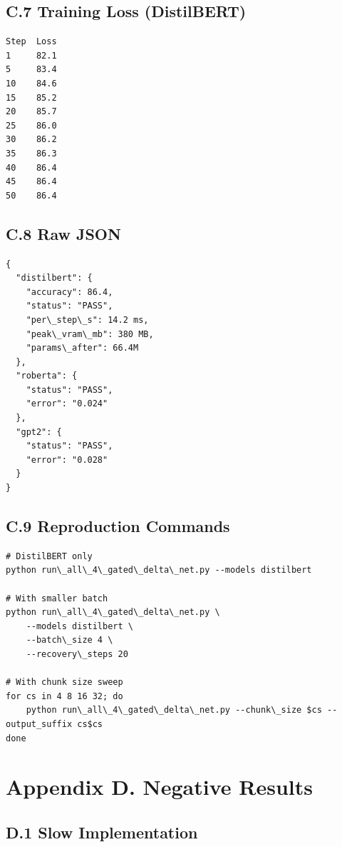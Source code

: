 \subsection{C.7 Training Loss (DistilBERT)}

\begin{lstlisting}
Step  Loss
1     82.1
5     83.4
10    84.6
15    85.2
20    85.7
25    86.0
30    86.2
35    86.3
40    86.4
45    86.4
50    86.4
\end{lstlisting}

\subsection{C.8 Raw JSON}

\begin{lstlisting}
{
  "distilbert": {
    "accuracy": 86.4,
    "status": "PASS",
    "per\_step\_s": 14.2 ms,
    "peak\_vram\_mb": 380 MB,
    "params\_after": 66.4M
  },
  "roberta": {
    "status": "PASS",
    "error": "0.024"
  },
  "gpt2": {
    "status": "PASS",
    "error": "0.028"
  }
}
\end{lstlisting}

\subsection{C.9 Reproduction Commands}

\begin{lstlisting}
# DistilBERT only
python run\_all\_4\_gated\_delta\_net.py --models distilbert

# With smaller batch
python run\_all\_4\_gated\_delta\_net.py \
    --models distilbert \
    --batch\_size 4 \
    --recovery\_steps 20

# With chunk size sweep
for cs in 4 8 16 32; do
    python run\_all\_4\_gated\_delta\_net.py --chunk\_size $cs --output_suffix cs$cs
done
\end{lstlisting}




\section{Appendix D. Negative Results}

\subsection{D.1 Slow Implementation}

